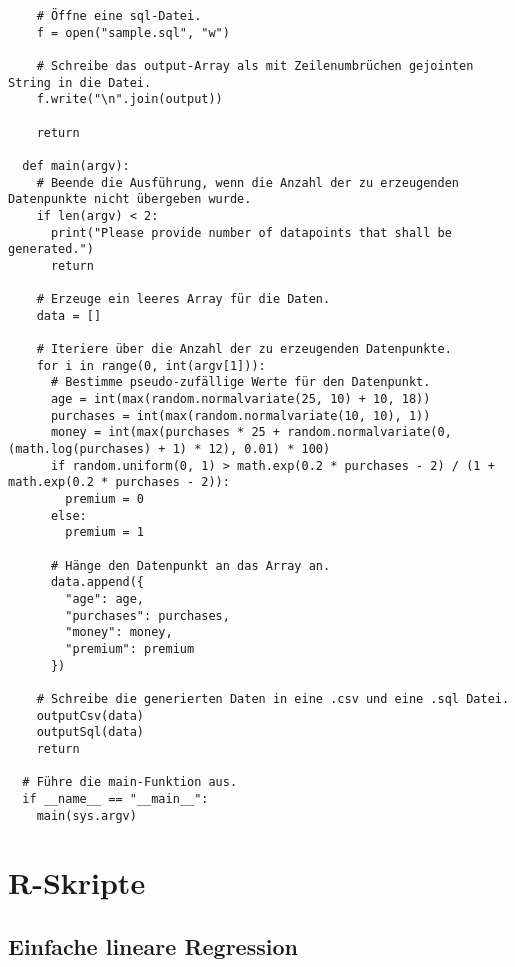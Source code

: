 \begin{verbatim}
    # Öffne eine sql-Datei.
    f = open("sample.sql", "w")

    # Schreibe das output-Array als mit Zeilenumbrüchen gejointen String in die Datei.
    f.write("\n".join(output))

    return

  def main(argv):
    # Beende die Ausführung, wenn die Anzahl der zu erzeugenden Datenpunkte nicht übergeben wurde.
    if len(argv) < 2:
      print("Please provide number of datapoints that shall be generated.")
      return

    # Erzeuge ein leeres Array für die Daten.
    data = []

    # Iteriere über die Anzahl der zu erzeugenden Datenpunkte.
    for i in range(0, int(argv[1])):
      # Bestimme pseudo-zufällige Werte für den Datenpunkt.
      age = int(max(random.normalvariate(25, 10) + 10, 18))
      purchases = int(max(random.normalvariate(10, 10), 1))
      money = int(max(purchases * 25 + random.normalvariate(0, (math.log(purchases) + 1) * 12), 0.01) * 100)
      if random.uniform(0, 1) > math.exp(0.2 * purchases - 2) / (1 + math.exp(0.2 * purchases - 2)):
        premium = 0
      else:
        premium = 1

      # Hänge den Datenpunkt an das Array an.
      data.append({
        "age": age,
        "purchases": purchases,
        "money": money,
        "premium": premium
      })

    # Schreibe die generierten Daten in eine .csv und eine .sql Datei.
    outputCsv(data)
    outputSql(data)
    return

  # Führe die main-Funktion aus.
  if __name__ == "__main__":
    main(sys.argv)
\end{verbatim}

\chapter{R-Skripte}
\label{appendix:B}

\section{Einfache lineare Regression}
\label{appendix:B:1}

